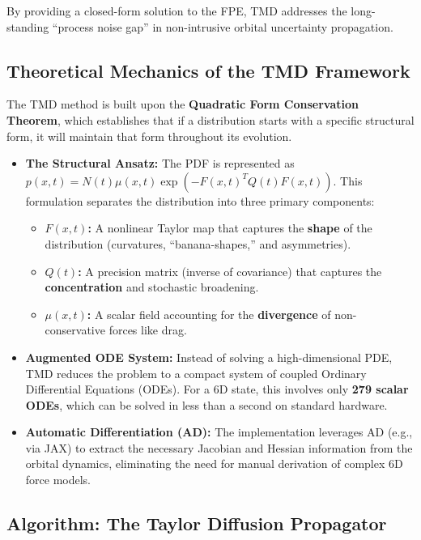 \documentclass[
  letterpaper,
  DIV=11,
  numbers=noendperiod,
  oneside]{scrartcl}
\begin{document}
By providing a closed-form solution to the FPE, TMD addresses the
long-standing ``process noise gap'' in non-intrusive orbital uncertainty
propagation.

\subsection{Theoretical Mechanics of the TMD
Framework}\label{theoretical-mechanics-of-the-tmd-framework}

The TMD method is built upon the \textbf{Quadratic Form Conservation
Theorem}, which establishes that if a distribution starts with a
specific structural form, it will maintain that form throughout its
evolution.

\begin{itemize}
\item
  \textbf{The Structural Ansatz:} The PDF is represented as
  \(p(x, t) = N(t) \mu(x, t) \exp(-F(x, t)^T Q(t) F(x, t))\). This
  formulation separates the distribution into three primary components:

  \begin{itemize}
  \item
    \textbf{\(F(x, t)\):} A nonlinear Taylor map that captures the
    \textbf{shape} of the distribution (curvatures, ``banana-shapes,''
    and asymmetries).
  \item
    \textbf{\(Q(t)\):} A precision matrix (inverse of covariance) that
    captures the \textbf{concentration} and stochastic broadening.
  \item
    \textbf{\(\mu(x, t)\):} A scalar field accounting for the
    \textbf{divergence} of non-conservative forces like drag.
  \end{itemize}
\item
  \textbf{Augmented ODE System:} Instead of solving a high-dimensional
  PDE, TMD reduces the problem to a compact system of coupled Ordinary
  Differential Equations (ODEs). For a 6D state, this involves only
  \textbf{279 scalar ODEs}, which can be solved in less than a second on
  standard hardware.
\item
  \textbf{Automatic Differentiation (AD):} The implementation leverages
  AD (e.g., via JAX) to extract the necessary Jacobian and Hessian
  information from the orbital dynamics, eliminating the need for manual
  derivation of complex 6D force models.
\end{itemize}

\subsection{Algorithm: The Taylor Diffusion
Propagator}\label{algorithm-the-taylor-diffusion-propagator}
\end{document}
